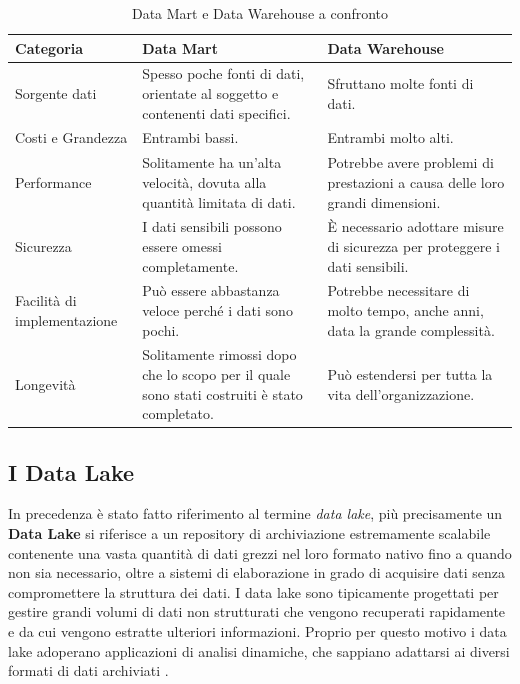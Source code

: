 \begin{longtable}{|p{4cm}|p{5cm}|p{5cm}|}
    \caption{Data Mart e Data Warehouse a confronto} \\
    \hline
    \textbf{Categoria} & \textbf{Data Mart} & \textbf{Data Warehouse}\\
    \hline
    \endfirsthead 
        
        Sorgente dati & Spesso poche fonti di dati, orientate al soggetto e contenenti dati specifici. & Sfruttano molte fonti di dati.\\
        \hline
        
        Costi e Grandezza & Entrambi bassi. & Entrambi molto alti.\\
        \hline
        
        Performance & Solitamente ha un'alta velocità, dovuta alla quantità limitata di dati. & Potrebbe avere problemi di prestazioni a causa delle loro grandi dimensioni.\\
        \hline
        
        Sicurezza & I dati sensibili possono essere omessi completamente. & È necessario adottare misure di sicurezza per proteggere i dati sensibili.\\
        \hline
        
        Facilità di implementazione & Può essere abbastanza veloce perché i dati sono pochi. & Potrebbe necessitare di molto tempo, anche anni, data la grande complessità.\\
        \hline
        
        Longevità & Solitamente rimossi dopo che lo scopo per il quale sono stati costruiti è stato completato. & Può estendersi per tutta la vita dell'organizzazione.\\
    
    \hline
\end{longtable}

\subsection{I Data Lake}

In precedenza è stato fatto riferimento al termine \textit{data lake}, più precisamente un \textbf{Data Lake} si riferisce a un repository di archiviazione estremamente scalabile contenente una vasta quantità di dati grezzi nel loro formato nativo fino a quando non sia necessario, oltre a sistemi di elaborazione in grado di acquisire dati senza compromettere la struttura dei dati. I data lake sono tipicamente progettati per gestire grandi volumi di dati non strutturati che vengono recuperati rapidamente e da cui vengono estratte ulteriori informazioni. Proprio per questo motivo i data lake adoperano applicazioni di analisi dinamiche, che sappiano adattarsi ai diversi formati di dati archiviati \cite{sciencedirect_data_lake}.

